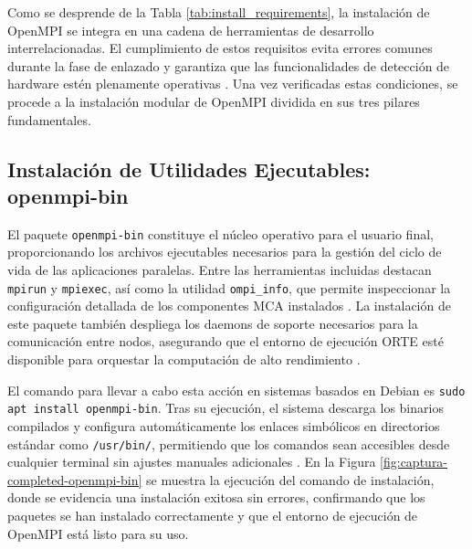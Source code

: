 Como se desprende de la Tabla \ref{tab:install_requirements}, la instalación de OpenMPI se integra en una cadena de herramientas de desarrollo interrelacionadas. El cumplimiento de estos requisitos evita errores comunes durante la fase de enlazado y garantiza que las funcionalidades de detección de hardware estén plenamente operativas \cite{ref12_cristian_Ubuntu_Packages}. Una vez verificadas estas condiciones, se procede a la instalación modular de OpenMPI dividida en sus tres pilares fundamentales.

\subsection{Instalación de Utilidades Ejecutables: openmpi-bin}

El paquete \texttt{openmpi-bin} constituye el núcleo operativo para el usuario final, proporcionando los archivos ejecutables necesarios para la gestión del ciclo de vida de las aplicaciones paralelas. Entre las herramientas incluidas destacan \texttt{mpirun} y \texttt{mpiexec}, así como la utilidad \texttt{ompi\_info}, que permite inspeccionar la configuración detallada de los componentes MCA instalados \cite{ref11_cristian_OpenMPI_FAQ, ref12_cristian_Ubuntu_Packages}. La instalación de este paquete también despliega los daemons de soporte necesarios para la comunicación entre nodos, asegurando que el entorno de ejecución ORTE esté disponible para orquestar la computación de alto rendimiento \cite{ref7_cristian_Squyres2004, ref4_cristian_Graham2005}.

El comando para llevar a cabo esta acción en sistemas basados en Debian es \texttt{sudo apt install openmpi-bin}. Tras su ejecución, el sistema descarga los binarios compilados y configura automáticamente los enlaces simbólicos en directorios estándar como \texttt{/usr/bin/}, permitiendo que los comandos sean accesibles desde cualquier terminal sin ajustes manuales adicionales \cite{ref13_cristian_Hokiegeek2024}. En la Figura \ref{fig:captura-completed-openmpi-bin} se muestra la ejecución del comando de instalación, donde se evidencia una instalación exitosa sin errores, confirmando que los paquetes se han instalado correctamente y que el entorno de ejecución de OpenMPI está listo para su uso.


